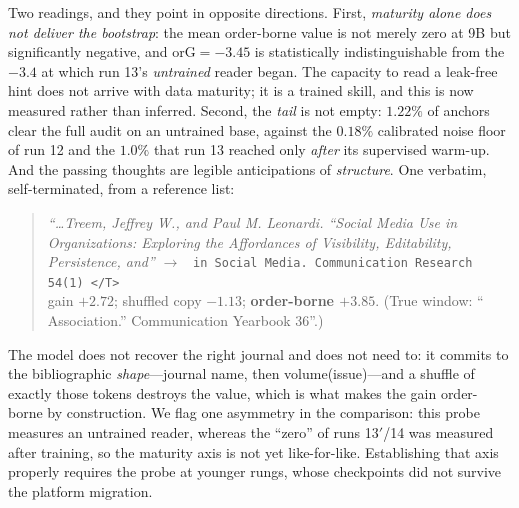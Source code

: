 \documentclass{article} %
\newcommand{\tend}{\texttt{</T>}}
\begin{document}
Two readings, and they point in opposite directions. First, \emph{maturity alone does not deliver the bootstrap}: the mean order-borne value is not merely zero at 9B but significantly negative, and $\mathrm{orG}=-3.45$ is statistically indistinguishable from the $-3.4$ at which run 13's \emph{untrained} reader began. The capacity to read a leak-free hint does not arrive with data maturity; it is a trained skill, and this is now measured rather than inferred. Second, the \emph{tail} is not empty: $1.22\%$ of anchors clear the full audit on an untrained base, against the $0.18\%$ calibrated noise floor of run 12 and the $1.0\%$ that run 13 reached only \emph{after} its supervised warm-up. And the passing thoughts are legible anticipations of \emph{structure}. One verbatim, self-terminated, from a reference list:
\begin{quote}\small
\emph{``\ldots Treem, Jeffrey W., and Paul M. Leonardi. ``Social Media Use in Organizations: Exploring the Affordances of Visibility, Editability, Persistence, and''} $\to$ \texttt{ in Social Media. Communication Research 54(1) \tend}\\
gain $+2.72$; shuffled copy $-1.13$; \textbf{order-borne $+3.85$}. (True window: `` Association.'' Communication Yearbook 36''.)
\end{quote}
The model does not recover the right journal and does not need to: it commits to the bibliographic \emph{shape}---journal name, then volume(issue)---and a shuffle of exactly those tokens destroys the value, which is what makes the gain order-borne by construction. We flag one asymmetry in the comparison: this probe measures an untrained reader, whereas the ``zero'' of runs 13$'$/14 was measured after training, so the maturity axis is not yet like-for-like. Establishing that axis properly requires the probe at younger rungs, whose checkpoints did not survive the platform migration.
\end{document}
